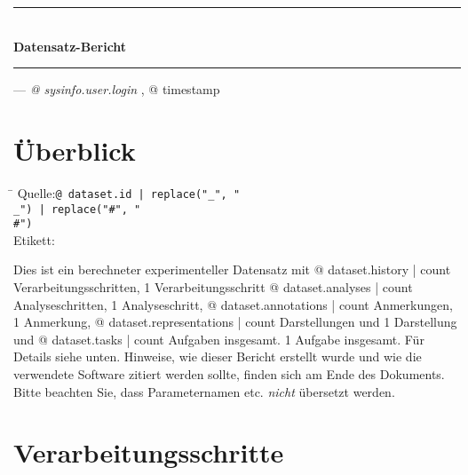 

\rule[1ex]{\textwidth}{1pt}
\\[1em]
\textbf{\LARGE Datensatz-Bericht}
\\[1ex]
\rule{\textwidth}{1pt}

\hfill --- \textsl{{@ sysinfo.user.login }}, {@ timestamp }

\section{Überblick}

\begin{tabbing}
\hspace*{1.5cm}\=\kill
Quelle:\>\texttt{{@ dataset.id | replace("_", "\\_") | replace("#", "\\#") }}
\\
Etikett:
\end{tabbing}

Dies ist ein %
berechneter %
experimenteller %
Datensatz mit
{@ dataset.history | count } Verarbeitungsschritten,
1 Verarbeitungsschritt
{@ dataset.analyses | count } Analyseschritten,
1 Analyseschritt,
{@ dataset.annotations | count } Anmerkungen,
1 Anmerkung,
{@ dataset.representations | count } Darstellungen und
1 Darstellung und
{@ dataset.tasks | count } Aufgaben insgesamt.
1 Aufgabe insgesamt.
Für Details siehe unten. Hinweise, wie dieser Bericht erstellt wurde und wie die verwendete Software zitiert werden sollte, finden sich am Ende des Dokuments. Bitte beachten Sie, dass Parameternamen etc. \emph{nicht} übersetzt werden.

\section{Verarbeitungsschritte}


